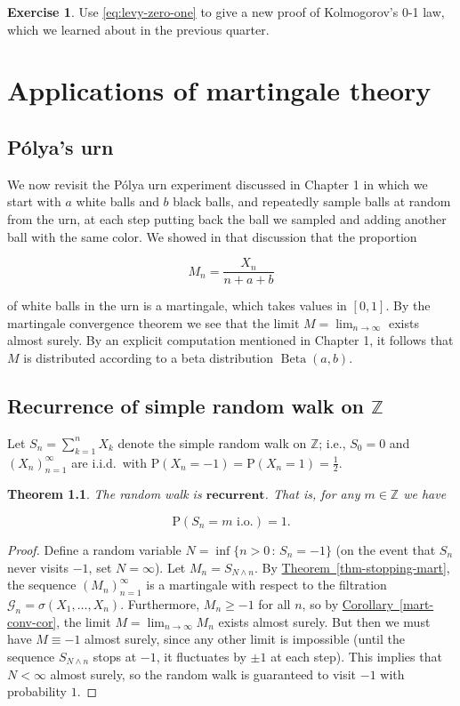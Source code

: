 \documentclass[11pt]{report}
\newcommand{\Z}{\mathbb{Z}}
\theoremstyle{plain}
\newtheorem{thm}{Theorem}[chapter]
\theoremstyle{definition}
\newtheorem{xexercise}[thm]{Exercise}
\begin{document}
\begin{xexercise}
Use \eqref{eq:levy-zero-one} to give a new proof of
Kolmogorov's 0-1 law, which we learned about in the
previous quarter.
\end{xexercise}

\chapter{Applications of martingale theory}

\section{Pólya's urn}

We now revisit the P\'olya urn experiment discussed
in Chapter 1 in which we start with $a$ white balls
and $b$ black balls, and repeatedly sample balls at
random from the urn, at each step putting back the
ball we sampled and adding another ball with the same
color. We showed in that discussion that the
proportion

\[
M_n = \frac{X_n}{n+a+b}
\]

\noindent of white balls in the urn is a martingale, which
takes values in $[0,1]$. By the martingale
convergence theorem we see that the limit
$M = \lim_{n\to\infty}$ exists almost surely. By an
explicit computation mentioned in Chapter 1, it
follows that $M$ is distributed according to a beta
distribution $\operatorname{Beta}(a,b)$.

\section{Recurrence of simple random walk on $\mathbb{Z}$}

Let $S_n = \sum_{k=1}^n X_k$ denote the simple random
walk on $\Z$; i.e., $S_0=0$ and $(X_n)_{n=1}^\infty$
are i.i.d.\ with
$\mathrm{P}(X_n=-1)=\mathrm{P}(X_n=1)=\tfrac12$.

\begin{thm}
The random walk is $\textbf{recurrent}$. That is, for
any $m\in\Z$ we have

\[
\mathrm{P}(S_n = m \textrm{ i.o.}) = 1.
\]

\end{thm}

\begin{proof}
Define a random variable
$N = \inf \{ n>0\,:\, S_n = -1 \}$ (on the event that
$S_n$ never visits $-1$, set $N=\infty$). Let
$M_n = S_{N\wedge n}$. By \texorpdfstring{\hyperref[thm-stopping-mart]{Theorem~\ref*{thm-stopping-mart}}}{Theorem}, the sequence $(M_n)_{n=1}^\infty$
is a martingale with respect to the filtration
$\mathcal{G}_n = \sigma(X_1,\ldots,X_n)$.
Furthermore, $M_n \ge -1$ for all $n$, so by
\hyperref[mart-conv-cor]{Corollary~\ref*{mart-conv-cor}}, the limit
$M=\lim_{n\to\infty} M_n$ exists almost surely. But
then we must have $M\equiv -1$ almost surely, since
any other limit is impossible (until the sequence
$S_{N\wedge n}$ stops at $-1$, it fluctuates by
$\pm 1$ at each step). This implies that $N<\infty$
almost surely, so the random walk is guaranteed to
visit $-1$ with probability $1$.
\end{proof}
\end{document}
